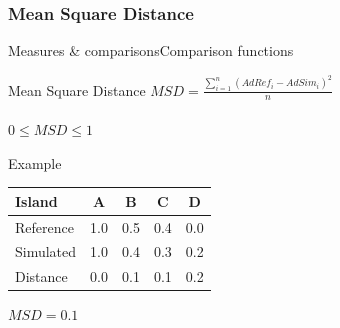 \documentclass[10pt, aspectratio=43]{beamer}
\begin{document}
\subsubsection{Mean Square Distance}
\begin{frame}{Measures \& comparisons}{Comparison functions}
\begin{mblock}{0.7}{Mean Square Distance}
  \centering  
  $\mathit{MSD} = \frac{\sum\limits_{i=1}^{n} \left( AdRef_i - AdSim_i \right) ^ 2}{n}$\\~\\
  $0 \le \mathit{MSD} \le 1$
\end{mblock}
\pause
\begin{mblock}{0.7}{Example}
  \begin{center}
    \begin{tabu}{@{}lcccc@{}}
      \toprule[1pt]
      Island & A & B & C & D \\
      \midrule
      Reference & 1.0 & 0.5 & 0.4 & 0.0 \\
      Simulated & 1.0 & 0.4 & 0.3 & 0.2 \\
      Distance & 0.0 & 0.1 & 0.1 & 0.2 \\
      \bottomrule[1pt]
    \end{tabu}
  \end{center}
  \centering
  $\mathit{MSD} = 0.1$
\end{mblock}
\end{frame}
\end{document}
